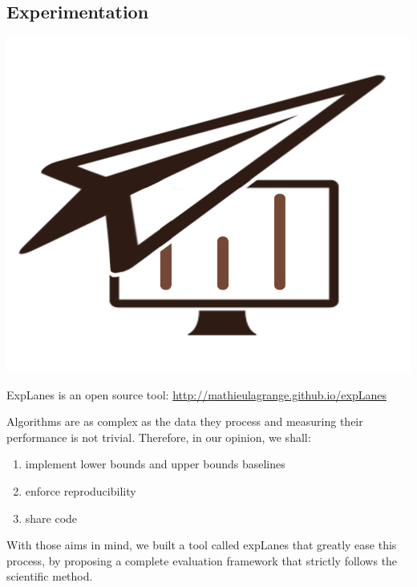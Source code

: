 \documentclass[a4paper,fleqn]{tufte-handout}
\begin{document}
\subsection{Experimentation}

\begin{marginfigure}
\begin{center}
\includegraphics[width=\textwidth]{figures/logo} 
\end{center}
\caption{\label{fig:explanes} ExpLanes is an open source tool: \url{http://mathieulagrange.github.io/expLanes}}
\end{marginfigure}

Algorithms are as complex as the data they process and measuring their performance is not trivial. Therefore, in our opinion, we shall:
\begin{enumerate}
\item implement lower bounds and upper bounds baselines
\item enforce reproducibility
\item share code
\end{enumerate}

With those aims in mind, we built a tool called \textsf{expLanes} that greatly ease this process, by proposing a complete evaluation framework that strictly follows the scientific method.%




  
 
  
\end{document}
